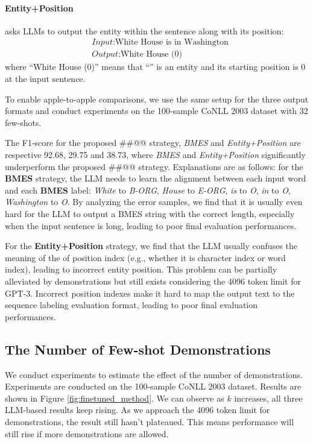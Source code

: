 \documentclass{article}
\begin{document}
\paragraph{Entity+Position} asks LLMs to output the entity within the sentence along with its position: 
\begin{equation}
\nonumber
    \begin{aligned}
    	&\textit{Input}\text{:White House is in Washington}\\
    	&\textit{Output}\text{:White House (0)}
    \end{aligned}
\end{equation}
where “White House (0)” means that “”  is an entity and its starting position is 0 at the input sentence.

To enable apple-to-apple comparisons, 
we use the same setup for the three output formats and conduct experiments on the 100-sample CoNLL 2003 dataset with 32 few-shots. 

The F1-score for the proposed \#\#@@ strategy, {\it BMES} and {\it Entity+Position} are respective 92.68, 29.75 and 38.73, where  {\it BMES} and {\it Entity+Position} 
 significantly  underperform the proposed \#\#@@ strategy. 
 Explanations are as follows: 
 for the \textbf{BMES} strategy, the LLM needs to learn the alignment between each input word and each \textbf{BMES} label: \textit{White} to \textit{B-ORG}, \textit{House} to \textit{E-ORG}, \textit{is} to \textit{O}, \textit{in} to \textit{O}, \textit{Washington} to \textit{O}. By analyzing the error samples, we find that it is usually even hard for the LLM to output a BMES string with the correct length, especially when the input sentence is long, leading to poor final evaluation performances. 

For the \textbf{Entity+Position} strategy, we find that the LLM usually confuses the meaning of the of position index (e.g., whether it is character index or word index), leading to incorrect entity position. This problem can be partially alleviated by demonstrations but still exists considering the 4096 token limit for GPT-3. 
Incorrect position indexes make it hard to map the output text to the sequence labeling evaluation format, leading to poor final evaluation performances. 

\subsection{The Number of Few-shot Demonstrations}
We conduct experiments to estimate the effect of the number of demonstrations. 
Experiments are conducted on the 100-sample CoNLL 2003 dataset.
Results are shown in Figure \ref{fig:finetuned_method}. We can observe as $k$ increases, all three LLM-based results keep rising.
As we approach the 4096 token limit for demonstrations, the result still hasn't plateaued.
This means performance will still rise if more demonstrations are allowed. 
\end{document}
